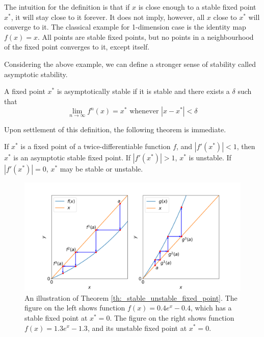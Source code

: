 The intuition for the definition is that if $x$ is close enough to a stable fixed point $x^*$, it will stay close to it forever. 
It does not imply, however, all $x$ close to $x^*$ will converge to it.
The classical example for 1-dimension case is the identity map $f(x) = x$. 
All points are stable fixed points, but no points in a neighbourhood of the fixed point converges to it, except itself.

Considering the above example, we can define a stronger sense of stability called asymptotic stability.

\begin{defn}
	A fixed point $x^*$ is asymptotically stable if it is stable and there exists a $\delta$ such that 
	$$
		\lim_{n \rightarrow \infty} f^n(x) = x^* \text{ whenever } |x - x^*| < \delta
	$$
\end{defn}

Upon settlement of this definition, the following theorem is immediate.

\begin{thm}\label{th:_stable_unstable_fixed_point}
	If $x^*$ is a fixed point of a twice-differentiable function $f$, and $|f'(x^*)| < 1$, then $x^*$ is an asymptotic stable fixed point.
	If $|f'(x^*)| > 1$, $x^*$ is unstable.
	If $|f'(x^*)| = 0$, $x^*$ may be stable or unstable.
\end{thm}

\begin{figure}
	\centering
	\includegraphics[width=\textwidth]{./figures/stable_and_unstable_fixed_point.png}
	\caption{An illustration of Theorem \ref{th:_stable_unstable_fixed_point}.
	The figure on the left shows function $f(x) = 0.4 e^x - 0.4$, which has a stable fixed point at $x^* = 0$. 
	The figure on the right shows function $f(x) = 1.3 e^x - 1.3$, and its unstable fixed point at $x^* = 0$.}
	\label{fig:stable and unstable fixed point}
\end{figure}

